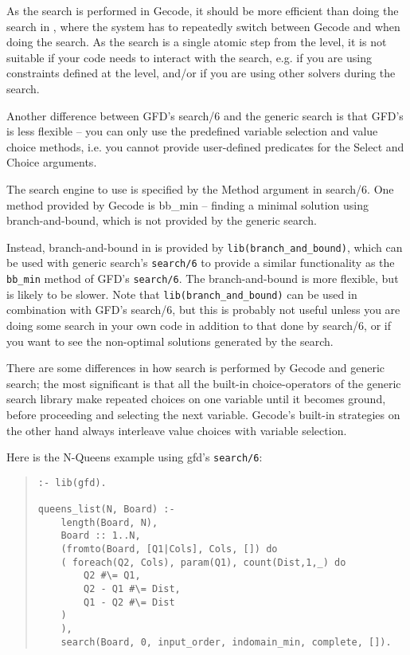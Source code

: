 As the search is performed in Gecode, it should be more efficient than doing
the search in \eclipse, where the system has to repeatedly switch between
Gecode and {\eclipse} when doing the search. As the search is a single atomic
step from the {\eclipse} level, it is not suitable if your code needs to
interact with the search, e.g. if you are using constraints defined at the
{\eclipse} level, and/or if you are using other solvers during the search.

Another difference between GFD's search/6 and the generic search is that 
GFD's is  less flexible -- you can only use the predefined variable 
selection and value choice methods, i.e. you cannot provide user-defined
predicates for the Select and Choice arguments. 

The search engine to use is specified by the Method argument in search/6. 
One method provided by Gecode is bb_min -- finding a minimal solution using
branch-and-bound, which is not provided by the generic search. 

Instead, branch-and-bound in {\eclipse} is provided by {\tt lib(branch_and_bound)}, which can
be used with generic search's {\tt search/6} to provide a similar functionality as
the {\tt bb_min} method of GFD's {\tt search/6}. The {\eclipse} branch-and-bound is more 
flexible, but is likely to be slower. Note that {\tt lib(branch_and_bound)} can
be used in combination with GFD's search/6, but this is probably not useful
unless you are doing some search in your own code in addition to that done by 
search/6, or if you want to see the non-optimal solutions generated by the
search.

There are some differences in how search is performed by Gecode and generic
search;
the most significant is that all the built-in choice-operators of the generic
search library make repeated choices on one variable until it becomes ground,
before proceeding and selecting the next variable.  Gecode's built-in
strategies on the other hand always interleave value choices with variable
selection.

Here is the N-Queens example using gfd's \texttt{search/6}:
\begin{quote}
\begin{verbatim}
:- lib(gfd).

queens_list(N, Board) :-
    length(Board, N),
    Board :: 1..N,
    (fromto(Board, [Q1|Cols], Cols, []) do
	( foreach(Q2, Cols), param(Q1), count(Dist,1,_) do
	    Q2 #\= Q1,
	    Q2 - Q1 #\= Dist,
	    Q1 - Q2 #\= Dist
	)
    ),
    search(Board, 0, input_order, indomain_min, complete, []).
\end{verbatim}
\end{quote}

